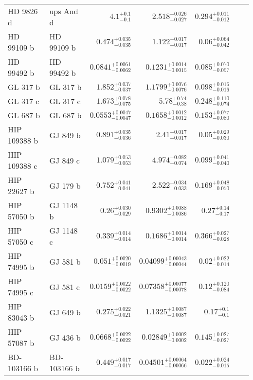 \begin{longtable*}{llrrrrr}
HD 9826 d & ups And d & $4.1^{+0.1}_{-0.1}$ & $2.518^{+0.026}_{-0.027}$ & $0.294^{+0.011}_{-0.012}$ & \cite{Butler99} & \\
HD 99109 b & HD 99109 b & $0.474^{+0.035}_{-0.035}$ & $1.122^{+0.017}_{-0.017}$ & $0.06^{+0.064}_{-0.042}$ & \cite{Butler06} & \\
HD 99492 b & HD 99492 b & $0.0841^{+0.0061}_{-0.0062}$ & $0.1231^{+0.0014}_{-0.0015}$ & $0.085^{+0.070}_{-0.057}$ & \cite{Marcy05} & \\
GL 317 b & GL 317 b & $1.852^{+0.037}_{-0.037}$ & $1.1799^{+0.0076}_{-0.0076}$ & $0.098^{+0.016}_{-0.016}$ & \cite{Johnson07b} & \\
GL 317 c & GL 317 c & $1.673^{+0.078}_{-0.075}$ & $5.78^{+0.74}_{-0.38}$ & $0.248^{+0.110}_{-0.074}$ & \cite{Anglada-Escude12} & \\
GL 687 b & GL 687 b & $0.0553^{+0.0047}_{-0.0047}$ & $0.1658^{+0.0012}_{-0.0012}$ & $0.153^{+0.077}_{-0.080}$ & \cite{Burt14} & \\
HIP 109388 b & GJ 849 b & $0.891^{+0.035}_{-0.036}$ & $2.41^{+0.017}_{-0.017}$ & $0.05^{+0.029}_{-0.030}$ & \cite{Butler06_GJ849} & \\
HIP 109388 c & GJ 849 c & $1.079^{+0.053}_{-0.053}$ & $4.974^{+0.082}_{-0.074}$ & $0.099^{+0.041}_{-0.040}$ & \cite{Feng15} & \\
HIP 22627 b & GJ 179 b & $0.752^{+0.041}_{-0.041}$ & $2.522^{+0.034}_{-0.033}$ & $0.169^{+0.048}_{-0.050}$ & \cite{Howard10} & \\
HIP 57050 b & GJ 1148 b & $0.26^{+0.030}_{-0.029}$ & $0.9302^{+0.0088}_{-0.0086}$ & $0.27^{+0.14}_{-0.17}$ & \cite{Haghighipour10} & \\
HIP 57050 c & GJ 1148 c & $0.339^{+0.014}_{-0.014}$ & $0.1686^{+0.0014}_{-0.0014}$ & $0.366^{+0.027}_{-0.028}$ & \cite{Trifonov17} & \\
HIP 74995 b & GJ 581 b & $0.051^{+0.0020}_{-0.0019}$ & $0.04099^{+0.00043}_{-0.00044}$ & $0.02^{+0.022}_{-0.014}$ & \cite{Bonfils05} & \\
HIP 74995 c & GJ 581 c & $0.0159^{+0.0022}_{-0.0022}$ & $0.07358^{+0.00077}_{-0.00078}$ & $0.12^{+0.120}_{-0.084}$ & \cite{Mayor09} & \\
HIP 83043 b & GJ 649 b & $0.275^{+0.022}_{-0.021}$ & $1.1325^{+0.0087}_{-0.0087}$ & $0.17^{+0.1}_{-0.1}$ & \cite{Johnson10} & \\
HIP 57087 b & GJ 436 b & $0.0668^{+0.0022}_{-0.0022}$ & $0.02849^{+0.0002}_{-0.0002}$ & $0.145^{+0.027}_{-0.027}$ & \cite{Butler04} & \\
BD-103166 b & BD-103166 b & $0.449^{+0.017}_{-0.017}$ & $0.04501^{+0.00064}_{-0.00066}$ & $0.022^{+0.024}_{-0.015}$ & \cite{Butler00} & \\

\end{longtable*}
